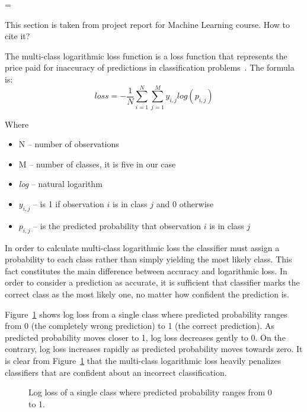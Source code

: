 \documentclass[a4paper, 11pt, table]{article}
\newenvironment{warning}
  {\par\begin{mdframed}[linewidth=2pt,linecolor=red]%
    \begin{list}{}{\leftmargin=1cm
                   \labelwidth=\leftmargin}\item[\Large\ding{43}]}
  {\end{list}\end{mdframed}\par}
\begin{document}
\begin{warning}
This section is taken from project report for Machine Learning course. How to cite it?
\end{warning}

The multi-class logarithmic loss function is a loss function that represents the price paid for inaccuracy of predictions in classification problems~\cite{rosasco}. The formula is:
\begin{equation}
loss = -\frac{1}{N} \sum_{i=1}^{N} \sum_{j=1}^{M} y_{i,j} log(p_{i,j})
\end{equation}

Where 
\begin{itemize}
\item N -- number of observations
\item M -- number of classes, it is five in our case
\item \textit{log} -- natural logarithm
\item $y_{i,j}$ -- is 1 if observation $i$ is in class $j$ and 0 otherwise
\item $p_{i,j}$ --  is the predicted probability that observation $i$ is in class $j$
\end{itemize}

In order to calculate multi-class logarithmic loss the classifier must assign a probability to each class rather than simply yielding the most likely class. This fact constitutes the main difference between accuracy and logarithmic loss. In order to consider a prediction as accurate, it is sufficient that classifier marks the correct class as the most likely one, no matter how confident the prediction is.

Figure~\ref{fig:logloss} shows log loss from a single class where predicted probability ranges from 0 (the completely wrong prediction) to 1 (the correct prediction). As predicted probability moves closer to 1, log loss decreases gently to 0. On the contrary, log loss increases rapidly as predicted probability moves towards zero. It is clear from Figure~\ref{fig:logloss} that the multi-class logarithmic loss heavily penalizes classifiers that are confident about an incorrect classification.

\begin{figure}[H]
\centering
{}
\caption{\label{fig:logloss} Log loss of a single class where predicted probability ranges from 0 to 1. }
\end{figure}
\end{document}
